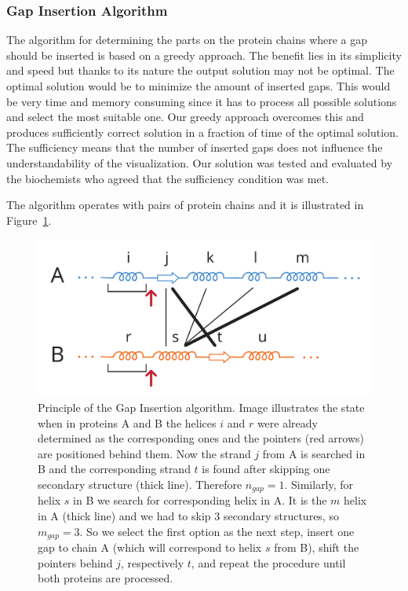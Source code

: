 \documentclass[twocolumn]{bmcart}%
\begin{document}
\subsubsection*{Gap Insertion Algorithm}
\label{sec:alg}
The algorithm for determining the parts on the protein chains where a gap should be inserted is based on a greedy approach.
The benefit lies in its simplicity and speed but thanks to its nature the output solution may not be optimal. 
The optimal solution would be to minimize the amount of inserted gaps.
This would be very time and memory consuming since it has to process all possible solutions and select the most suitable one.
Our greedy approach overcomes this and produces sufficiently correct solution in a fraction of time of the optimal solution.
The sufficiency means that the number of inserted gaps does not influence the understandability of the visualization.
Our solution was tested and evaluated by the biochemists who agreed that the sufficiency condition was met. 

The algorithm operates with pairs of protein chains and it is illustrated in Figure~\ref{fig:alg1}.

\begin{figure}[t!]
  \centering
  \includegraphics[width=0.9\linewidth]{pics/first.pdf}
  \caption{Principle of the Gap Insertion algorithm. Image illustrates the state when in proteins A and B the helices $i$ and $r$ were already determined as the corresponding ones and the pointers (red arrows) are positioned behind them. Now the strand $j$ from A is searched in B and the corresponding strand $t$ is found after skipping one secondary structure (thick line). Therefore $n_{gap} = 1$. Similarly, for helix $s$ in B we search for corresponding helix in A. It is the $m$ helix in A (thick line) and we had to skip 3 secondary structures, so  $m_{gap} = 3$. So we select the first option as the next step, insert one gap to chain A (which will correspond to helix $s$ from B), shift the pointers behind $j$, respectively $t$, and repeat the procedure until both proteins are processed.}
  \label{fig:alg1}
\end{figure}
\end{document}

